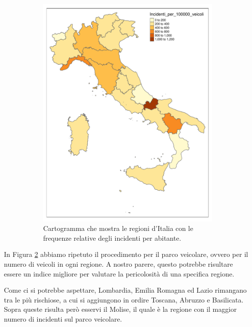 \documentclass[12pt,a4paper,final,oneside]{article}			%
\begin{document}
\begin{figure}[h]
\begin{subfigure}{0.4\textwidth}
                \includegraphics[scale=0.4]{../results/incidenti_per_100000_veicoli.pdf}
                \caption{Cartogramma che mostra le regioni d’Italia con le frequenze relative degli incidenti per abitante.}
                \label{Fig: mappa_incidenti_regioni_per_veicoli}
            \end{subfigure}
            \caption{}
        \end{figure}
        
        In Figura \ref{Fig: mappa_incidenti_regioni_per_veicoli} abbiamo ripetuto il procedimento per il parco veicolare, ovvero per il numero di veicoli in ogni regione. A nostro parere, questo potrebbe risultare essere un indice migliore per valutare la pericolosità di una specifica regione. 
        
        
        
        Come ci si potrebbe aspettare, Lombardia, Emilia Romagna ed Lazio rimangano tra le più rischiose, a cui si aggiungono in ordire Toscana, Abruzzo e Basilicata. Sopra queste risulta però esservi il Molise, il quale è la regione con il maggior numero di incidenti sul parco veicolare.
        
\end{document}
